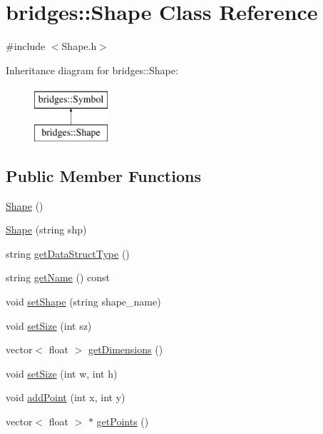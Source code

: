\hypertarget{classbridges_1_1_shape}{}\section{bridges\+:\+:Shape Class Reference}
\label{classbridges_1_1_shape}


{\ttfamily \#include $<$Shape.\+h$>$}

Inheritance diagram for bridges\+:\+:Shape\+:\begin{figure}[H]
\begin{center}
\leavevmode
\includegraphics[height=2.000000cm]{classbridges_1_1_shape}
\end{center}
\end{figure}
\subsection*{Public Member Functions}
\begin{DoxyCompactItemize}
\item 
\hyperlink{classbridges_1_1_shape_a1bab5bd0c3c89c6274a5a309b2aa184a}{Shape} ()
\item 
\hyperlink{classbridges_1_1_shape_a5ad5fa644f2c62c156427d0fef463f5b}{Shape} (string shp)
\item 
string \hyperlink{classbridges_1_1_shape_ac1aa859856aad0bac2716f98e87028ba}{get\+Data\+Struct\+Type} ()
\item 
string \hyperlink{classbridges_1_1_shape_a04217dbeb5a4e5ffb2a581c878a4120f}{get\+Name} () const 
\item 
void \hyperlink{classbridges_1_1_shape_aed60b6e9a673eebc2b53d9053227a7c5}{set\+Shape} (string shape\+\_\+name)
\item 
void \hyperlink{classbridges_1_1_shape_a0fa2dae24c7ea2654b54e03adcdefa67}{set\+Size} (int sz)
\item 
vector$<$ float $>$ \hyperlink{classbridges_1_1_shape_a51efcce7a516ec5feeead962ad87e8b8}{get\+Dimensions} ()
\item 
void \hyperlink{classbridges_1_1_shape_ae90702ee6a0cfd866eec71c5f6ec0559}{set\+Size} (int w, int h)
\item 
void \hyperlink{classbridges_1_1_shape_a94fd45e9adb2b4e5da19e0a0288c11cb}{add\+Point} (int x, int y)
\item 
vector$<$ float $>$ $\ast$ \hyperlink{classbridges_1_1_shape_a564705d44df51d18e12c35304f5f678c}{get\+Points} ()
\end{DoxyCompactItemize}
